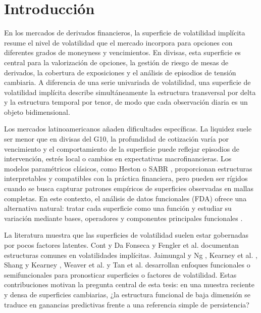 \documentclass[a4paper,11pt]{article}
\newcommand{\SVI}{superficie de volatilidad implícita}
\begin{document}
\newpage
\tableofcontents
\newpage

\section{Introducción}

En los mercados de derivados financieros, la \SVI{} resume el nivel de volatilidad que el mercado incorpora para opciones con diferentes grados de moneyness y vencimientos. En divisas, esta superficie es central para la valorización de opciones, la gestión de riesgo de mesas de derivados, la cobertura de exposiciones y el análisis de episodios de tensión cambiaria. A diferencia de una serie univariada de volatilidad, una \SVI{} describe simultáneamente la estructura transversal por delta y la estructura temporal por tenor, de modo que cada observación diaria es un objeto bidimensional.

Los mercados latinoamericanos añaden dificultades específicas. La liquidez suele ser menor que en divisas del G10, la profundidad de cotización varía por vencimiento y el comportamiento de la superficie puede reflejar episodios de intervención, estrés local o cambios en expectativas macrofinancieras. Los modelos paramétricos clásicos, como Heston \cite{Heston1993} o SABR \cite{Hagan2002}, proporcionan estructuras interpretables y compatibles con la práctica financiera, pero pueden ser rígidos cuando se busca capturar patrones empíricos de superficies observadas en mallas completas. En este contexto, el análisis de datos funcionales (FDA) ofrece una alternativa natural: tratar cada superficie como una función y estudiar su variación mediante bases, operadores y componentes principales funcionales \cite{RamsaySilverman2006}.

La literatura muestra que las superficies de volatilidad suelen estar gobernadas por pocos factores latentes. Cont y Da Fonseca \cite{ContDaFonseca2002} y Fengler et al. \cite{Fengler2003} documentan estructuras comunes en volatilidades implícitas. Jaimungal y Ng \cite{JaimungalNg2007}, Kearney et al. \cite{Kearney2018}, Shang y Kearney \cite{ShangKearney2022}, Weaver et al. \cite{Weaver2020} y Tan et al. \cite{Tan2024} desarrollan enfoques funcionales o semifuncionales para pronosticar superficies o factores de volatilidad. Estas contribuciones motivan la pregunta central de esta tesis: en una muestra reciente y densa de superficies cambiarias, ¿la estructura funcional de baja dimensión se traduce en ganancias predictivas frente a una referencia simple de persistencia?
\end{document}
